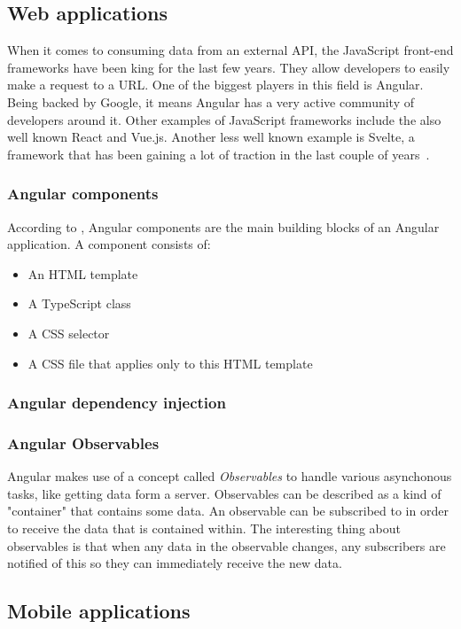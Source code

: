 \subsection{Web applications}

When it comes to consuming data from an external API, the JavaScript front-end frameworks have been king for the last few years. They allow developers to easily make a request to a URL. One of the biggest players in this field is Angular. Being backed by Google, it means Angular has a very active community of developers around it. Other examples of JavaScript frameworks include the also well known React and Vue.js. Another less well known example is Svelte, a framework that has been gaining a lot of traction in the last couple of years~\autocite{Uzayr2019}.

\subsubsection{Angular components}

According to \textcite{Freeman2020}, Angular components are the main building blocks of an Angular application. A component consists of:

\begin{itemize}
	\item An HTML template
	\item A TypeScript class
	\item A CSS selector
	\item A CSS file that applies only to this HTML template
\end{itemize}



\subsubsection{Angular dependency injection}

\subsubsection{Angular Observables}

Angular makes use of a concept called \emph{Observables} to handle various asynchonous tasks, like getting data form a server. Observables can be described as a kind of "container" that contains some data. An observable can be subscribed to in order to receive the data that is contained within. The interesting thing about observables is that when any data in the observable changes, any subscribers are notified of this so they can immediately receive the new data.

\subsection{Mobile applications}